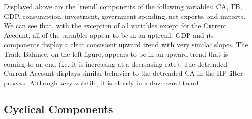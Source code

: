 \documentclass[12pt]{article}
\begin{document}
\begin{flushleft}
Displayed above are the 'trend' components of the following variables: CA, TB, GDP, consumption, investment, government spending, net exports, and imports. 
\break
\linebreak
We can see that, with the exception of all variables except for the Current Account, all of the variables appear to be in an uptrend. GDP and its components display a clear consistent upward trend with very similar slopes. The Trade Balance, on the left figure, appears to be in an upward trend that is coming to an end (i.e. it is increasing at a decreasing rate).
\break
\linebreak
The detrended Current Account displays similar behavior to the detrended CA in the HP filter process. Although very volatile, it is clearly in a downward trend.
\end{flushleft}

\newpage

\subsection{Cyclical Components}
\end{document}
